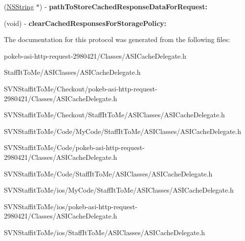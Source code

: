 \begin{DoxyCompactItemize}
\item 
\hypertarget{protocol_a_s_i_cache_delegate-p_ab7f2a212c2d6391b1d9fb7a8da9f2c39}{
(\hyperlink{class_n_s_string}{\-N\-S\-String} $\ast$) -\/ {\bfseries path\-To\-Store\-Cached\-Response\-Data\-For\-Request\-:}}
\label{protocol_a_s_i_cache_delegate-p_ab7f2a212c2d6391b1d9fb7a8da9f2c39}

\item 
\hypertarget{protocol_a_s_i_cache_delegate-p_abb2c511be4be2274bd3e812ea978e2a6}{
(void) -\/ {\bfseries clear\-Cached\-Responses\-For\-Storage\-Policy\-:}}
\label{protocol_a_s_i_cache_delegate-p_abb2c511be4be2274bd3e812ea978e2a6}

\end{DoxyCompactItemize}


\-The documentation for this protocol was generated from the following files\-:\begin{DoxyCompactItemize}
\item 
pokeb-\/asi-\/http-\/request-\/2980421/\-Classes/\-A\-S\-I\-Cache\-Delegate.\-h\item 
\-Staff\-It\-To\-Me/\-A\-S\-I\-Classes/\-A\-S\-I\-Cache\-Delegate.\-h\item 
\-S\-V\-N\-Staffit\-To\-Me/\-Checkout/pokeb-\/asi-\/http-\/request-\/2980421/\-Classes/\-A\-S\-I\-Cache\-Delegate.\-h\item 
\-S\-V\-N\-Staffit\-To\-Me/\-Checkout/\-Staff\-It\-To\-Me/\-A\-S\-I\-Classes/\-A\-S\-I\-Cache\-Delegate.\-h\item 
\-S\-V\-N\-Staffit\-To\-Me/\-Code/\-My\-Code/\-Staff\-It\-To\-Me/\-A\-S\-I\-Classes/\-A\-S\-I\-Cache\-Delegate.\-h\item 
\-S\-V\-N\-Staffit\-To\-Me/\-Code/pokeb-\/asi-\/http-\/request-\/2980421/\-Classes/\-A\-S\-I\-Cache\-Delegate.\-h\item 
\-S\-V\-N\-Staffit\-To\-Me/\-Code/\-Staff\-It\-To\-Me/\-A\-S\-I\-Classes/\-A\-S\-I\-Cache\-Delegate.\-h\item 
\-S\-V\-N\-Staffit\-To\-Me/ios/\-My\-Code/\-Staff\-It\-To\-Me/\-A\-S\-I\-Classes/\-A\-S\-I\-Cache\-Delegate.\-h\item 
\-S\-V\-N\-Staffit\-To\-Me/ios/pokeb-\/asi-\/http-\/request-\/2980421/\-Classes/\-A\-S\-I\-Cache\-Delegate.\-h\item 
\-S\-V\-N\-Staffit\-To\-Me/ios/\-Staff\-It\-To\-Me/\-A\-S\-I\-Classes/\-A\-S\-I\-Cache\-Delegate.\-h\end{DoxyCompactItemize}
